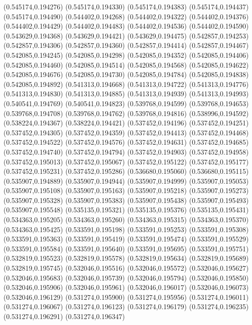 (0.545174,0.194276)
(0.545174,0.194330)
(0.545174,0.194383)
(0.545174,0.194437)
(0.545174,0.194490)
(0.544402,0.194268)
(0.544402,0.194322)
(0.544402,0.194376)
(0.544402,0.194429)
(0.544402,0.194483)
(0.544402,0.194536)
(0.544402,0.194590)
(0.543629,0.194368)
(0.543629,0.194421)
(0.543629,0.194475)
(0.542857,0.194253)
(0.542857,0.194306)
(0.542857,0.194360)
(0.542857,0.194414)
(0.542857,0.194467)
(0.542085,0.194245)
(0.542085,0.194298)
(0.542085,0.194352)
(0.542085,0.194406)
(0.542085,0.194460)
(0.542085,0.194514)
(0.542085,0.194568)
(0.542085,0.194622)
(0.542085,0.194676)
(0.542085,0.194730)
(0.542085,0.194784)
(0.542085,0.194838)
(0.542085,0.194892)
(0.541313,0.194668)
(0.541313,0.194722)
(0.541313,0.194776)
(0.541313,0.194830)
(0.541313,0.194885)
(0.541313,0.194939)
(0.541313,0.194993)
(0.540541,0.194769)
(0.540541,0.194823)
(0.539768,0.194599)
(0.539768,0.194653)
(0.539768,0.194708)
(0.539768,0.194762)
(0.539768,0.194816)
(0.538996,0.194592)
(0.538224,0.194367)
(0.538224,0.194421)
(0.537452,0.194196)
(0.537452,0.194251)
(0.537452,0.194305)
(0.537452,0.194359)
(0.537452,0.194413)
(0.537452,0.194468)
(0.537452,0.194522)
(0.537452,0.194576)
(0.537452,0.194631)
(0.537452,0.194685)
(0.537452,0.194740)
(0.537452,0.194794)
(0.537452,0.194903)
(0.537452,0.194958)
(0.537452,0.195013)
(0.537452,0.195067)
(0.537452,0.195122)
(0.537452,0.195177)
(0.537452,0.195231)
(0.537452,0.195286)
(0.536680,0.195060)
(0.536680,0.195115)
(0.535907,0.194889)
(0.535907,0.194944)
(0.535907,0.194999)
(0.535907,0.195053)
(0.535907,0.195108)
(0.535907,0.195163)
(0.535907,0.195218)
(0.535907,0.195273)
(0.535907,0.195328)
(0.535907,0.195383)
(0.535907,0.195438)
(0.535907,0.195493)
(0.535907,0.195548)
(0.535135,0.195321)
(0.535135,0.195376)
(0.535135,0.195431)
(0.534363,0.195205)
(0.534363,0.195260)
(0.534363,0.195315)
(0.534363,0.195370)
(0.534363,0.195425)
(0.533591,0.195198)
(0.533591,0.195253)
(0.533591,0.195308)
(0.533591,0.195363)
(0.533591,0.195419)
(0.533591,0.195474)
(0.533591,0.195529)
(0.533591,0.195584)
(0.533591,0.195640)
(0.533591,0.195695)
(0.533591,0.195751)
(0.532819,0.195523)
(0.532819,0.195578)
(0.532819,0.195634)
(0.532819,0.195689)
(0.532819,0.195745)
(0.532046,0.195516)
(0.532046,0.195572)
(0.532046,0.195627)
(0.532046,0.195683)
(0.532046,0.195739)
(0.532046,0.195794)
(0.532046,0.195850)
(0.532046,0.195906)
(0.532046,0.195961)
(0.532046,0.196017)
(0.532046,0.196073)
(0.532046,0.196129)
(0.531274,0.195900)
(0.531274,0.195956)
(0.531274,0.196011)
(0.531274,0.196067)
(0.531274,0.196123)
(0.531274,0.196179)
(0.531274,0.196235)
(0.531274,0.196291)
(0.531274,0.196347)
